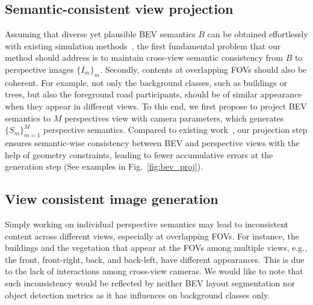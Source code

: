 \subsection{Semantic-consistent view projection}\label{sec:pers_map}
Assuming that diverse yet plausible BEV semantics $\textit{B}$ can be obtained effortlessly with existing simulation methods~\cite{Wang_2019_CVPR}, the first fundamental problem that our method should address is to maintain cross-view semantic consistency from $\textit{B}$ to perspective images $\{I_m\}_m$. Secondly, contents at overlapping FOVs should also be coherent. For example, not only the background classes, such as buildings or trees, but also the foreground road participants, should be of similar appearance when they appear in different views. To this end, we first propose to project BEV semantics to $M$ perspectives view with camera parameters, which generates $\{S_m\}_{m=1}^M$ perspective semantics. Compared to existing work~\cite{zhang2023adding}, our projection step ensures semantic-wise consistency between BEV and perspective views with the help of geometry constraints, leading to fewer accumulative errors at the generation step (See examples in Fig.~\ref{fig:bev_proj}). %

\subsection{View consistent image generation}\label{sec:model}
Simply working on individual perspective semantics may lead to inconsistent content across different views, especially at overlapping FOVs. For instance, the buildings and the vegetation that appear at the FOVs among multiple views, e.g., the front, front-right, back, and back-left, have different appearances. This is due to the lack of interactions among cross-view cameras. We would like to note that such inconsistency would be reflected by neither BEV layout segmentation nor object detection metrics as it has influences on background classes only. 

